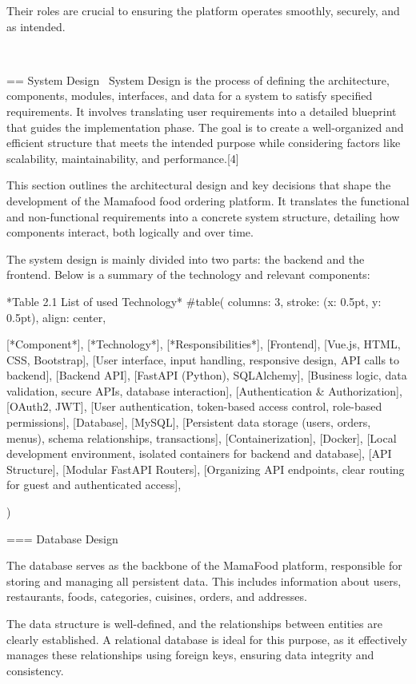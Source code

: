 Their roles are crucial to ensuring the platform operates smoothly, securely, and as intended.


\

== System Design
\
System Design is the process of defining the architecture, components, modules, interfaces, and data for a system to satisfy specified requirements. It involves translating user requirements into a detailed blueprint that guides the implementation phase. The goal is to create a well-organized and efficient structure that meets the intended purpose while considering factors like scalability, maintainability, and performance.[4]

This section outlines the architectural design and key decisions that shape the development of the Mamafood food ordering platform. It translates the functional and non-functional requirements into a concrete system structure, detailing how components interact, both logically and over time. 

The system design is mainly divided into two parts: the backend and the frontend. Below is a summary of the technology and relevant components:
\
\

*Table 2.1 List of used Technology*
#table(
  columns: 3,
  stroke: (x: 0.5pt, y: 0.5pt),
  align: center,

  [*Component*], [*Technology*], [*Responsibilities*],
  [Frontend], [Vue.js, HTML, CSS, Bootstrap], [User interface, input handling, responsive design, API calls to backend],
  [Backend API], [FastAPI (Python), SQLAlchemy], [Business logic, data validation, secure APIs, database interaction],
  [Authentication & Authorization], [OAuth2, JWT], [User authentication, token-based access control, role-based permissions],
  [Database], [MySQL], [Persistent data storage (users, orders, menus), schema relationships, transactions],
  [Containerization], [Docker], [Local development environment, isolated containers for backend and database],
  [API Structure], [Modular FastAPI Routers], [Organizing API endpoints, clear routing for guest and authenticated access],

)

=== Database Design
\

The database serves as the backbone of the MamaFood platform, responsible for storing and managing all persistent data. This includes information about users, restaurants, foods, categories, cuisines, orders, and addresses.

The data structure is well-defined, and the relationships between entities are clearly established. A relational database is ideal for this purpose, as it effectively manages these relationships using foreign keys, ensuring data integrity and consistency.

